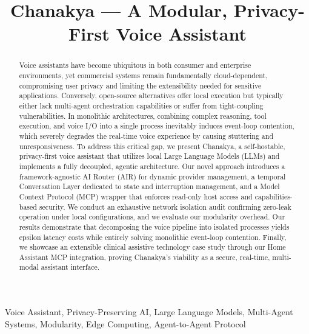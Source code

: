 \documentclass[conference]{IEEEtran}
\begin{document}
\title{Chanakya --- A Modular, Privacy-First Voice Assistant}

\author{
\and
{}
}

\maketitle

\begin{abstract}
Voice assistants have become ubiquitous in both consumer and enterprise environments, yet commercial systems remain fundamentally cloud-dependent, compromising user privacy and limiting the extensibility needed for sensitive applications. Conversely, open-source alternatives offer local execution but typically either lack multi-agent orchestration capabilities or suffer from tight-coupling vulnerabilities. In monolithic architectures, combining complex reasoning, tool execution, and voice I/O into a single process inevitably induces event-loop contention, which severely degrades the real-time voice experience by causing stuttering and unresponsiveness. To address this critical gap, we present Chanakya, a self-hostable, privacy-first voice assistant that utilizes local Large Language Models (LLMs) and implements a fully decoupled, agentic architecture. Our novel approach introduces a framework-agnostic AI Router (AIR) for dynamic provider management, a temporal Conversation Layer dedicated to state and interruption management, and a Model Context Protocol (MCP) wrapper that enforces read-only host access and capabilities-based security. We conduct an exhaustive network isolation audit confirming zero-leak operation under local configurations, and we evaluate our modularity overhead. Our results demonstrate that decomposing the voice pipeline into isolated processes yields epsilon latency costs while entirely solving monolithic event-loop contention. Finally, we showcase an extensible clinical assistive technology case study through our Home Assistant MCP integration, proving Chanakya's viability as a secure, real-time, multi-modal assistant interface.
\end{abstract}

\begin{IEEEkeywords}
Voice Assistant, Privacy-Preserving AI, Large Language Models, Multi-Agent Systems, Modularity, Edge Computing, Agent-to-Agent Protocol
\end{IEEEkeywords}
\end{document}

